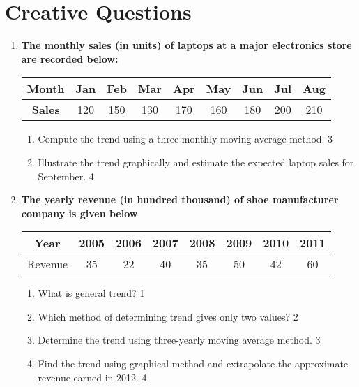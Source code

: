 \documentclass[a4paper,oneside]{book}
\begin{document}
\section{Creative Questions}
  \begin{enumerate}
  
  \item
\textbf{The monthly sales (in units) of laptops at a major electronics store are recorded below:} 

\begin{table}[h]
\centering
\begin{tabular}{c|cccccccc}
\textbf{Month} & Jan & Feb & Mar & Apr & May & Jun & Jul & Aug \\ \hline
\textbf{Sales} & 120 & 150 & 130 & 170 & 160 & 180 & 200 & 210
\end{tabular}
\end{table}

\begin{enumerate}
  \item  
  Compute the trend using a three-monthly moving average method. \hfill 3
  \item
  Illustrate the trend graphically and estimate the expected laptop sales for September. \hfill 4
\end{enumerate}


   \item
	  \textbf{The yearly revenue (in hundred thousand) of shoe manufacturer company is given below} 
  \begin{table}[h]
\centering
\begin{tabular}{cccccccc}
Year     & 2005 & 2006 & 2007 & 2008 & 2009 & 2010 & 2011 \\ \hline
Revenue & 35   & 22    & 40     & 35     & 50     & 42 & 60   
\end{tabular}
\end{table}
  
  \begin{enumerate}
    \item
	What is general trend? \hfill 1
    \item
	Which method of determining trend gives only two values? \hfill 2
    \item  
	Determine the trend using three-yearly moving average method. \hfill 3
    \item
	Find the trend using graphical method and extrapolate the approximate revenue earned in 2012. \hfill 4
  \end{enumerate}
  

\end{enumerate}
\end{document}
